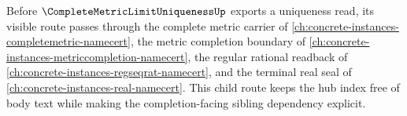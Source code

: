Before $\CompleteMetricLimitUniquenessUp$ exports a uniqueness read, its visible route passes through the complete metric carrier of \autoref{ch:concrete-instances-completemetric-namecert}, the metric completion boundary of \autoref{ch:concrete-instances-metriccompletion-namecert}, the regular rational readback of \autoref{ch:concrete-instances-regseqrat-namecert}, and the terminal real seal of \autoref{ch:concrete-instances-real-namecert}. This child route keeps the hub index free of body text while making the completion-facing sibling dependency explicit.
